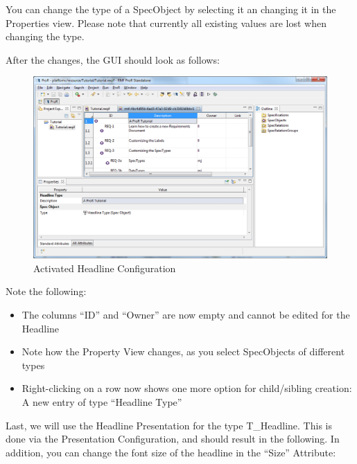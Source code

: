 You can change the type of a SpecObject by selecting it an changing it
in the Properties view. Please note that currently all existing values
are lost when changing the type.

After the changes, the GUI should look as follows:

\begin{figure}[h!]
\centering      
\includegraphics[width=\linewidth]{../rmf-images/pror_gui_with_headline.png}      
\caption{Activated Headline Configuration}      
\label{fig:activeHeadlineConfig}
\end{figure}

Note the following:

\begin{itemize}
\item
  The columns ``ID'' and ``Owner'' are now empty and cannot be edited
  for the Headline
\item
  Note how the Property View changes, as you select SpecObjects of
  different types
\item
  Right-clicking on a row now shows one more option for child/sibling
  creation: A new entry of type ``Headline Type''
\end{itemize}

Last, we will use the Headline Presentation for the type T\_Headline.
This is done via the Presentation Configuration, and should result in
the following. In addition, you can change the font size of the headline
in the ``Size'' Attribute:

